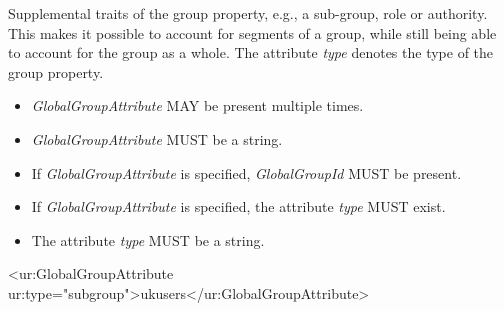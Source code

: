 Supplemental traits of the group property, e.g., a sub-group, role or authority. This makes it possible to account for segments of a group, while still being able to account for the group as a whole. 
The attribute \emph{type} denotes the type of the group property. 

\begin{itemize}
\item \emph{GlobalGroupAttribute} MAY be present multiple times.
\item \emph{GlobalGroupAttribute} MUST be a string.
\item If \emph{GlobalGroupAttribute} is specified, \emph{GlobalGroupId} MUST be present.
\item If \emph{GlobalGroupAttribute} is specified, the attribute \emph{type} MUST exist.
\item The attribute \emph{type} MUST be a string.
\end{itemize}

\begin{XMLexample}
<ur:GlobalGroupAttribute ur:type="subgroup">ukusers</ur:GlobalGroupAttribute>
\end{XMLexample}
